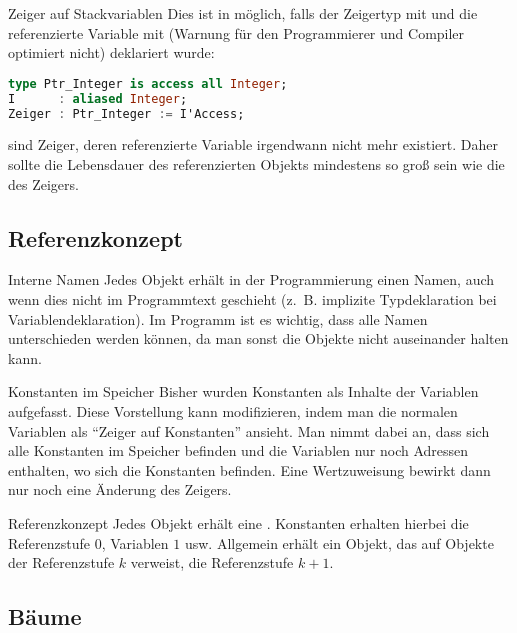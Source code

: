 \begin{Def}{Zeiger auf Stackvariablen}
    Dies ist in \Ada{} möglich, falls der Zeigertyp mit  und die
    referenzierte Variable mit  (Warnung für den Programmierer
    und Compiler optimiert nicht)
    deklariert wurde:

\begin{lstlisting}[language=ada]
type Ptr_Integer is access all Integer;
I      : aliased Integer;
Zeiger : Ptr_Integer := I'Access;
\end{lstlisting}

     sind Zeiger, deren referenzierte Variable
    irgendwann nicht mehr existiert. Daher sollte die Lebensdauer des
    referenzierten Objekts mindestens so groß sein wie die des Zeigers.
\end{Def}

\subsection{%
    Referenzkonzept%
}

\begin{Def}{Interne Namen}
    Jedes Objekt erhält in der Programmierung einen Namen, auch wenn dies nicht
    im Programmtext geschieht (z.~B. implizite Typdeklaration bei
    Variablendeklaration).
    Im Programm ist es wichtig, dass alle Namen unterschieden werden können,
    da man sonst die Objekte nicht auseinander halten kann.
\end{Def}

\begin{Def}{Konstanten im Speicher}
    Bisher wurden Konstanten als Inhalte der Variablen aufgefasst.
    Diese Vorstellung kann modifizieren, indem man die normalen Variablen als
    "`Zeiger auf Konstanten"' ansieht.
    Man nimmt dabei an, dass sich alle Konstanten im Speicher befinden und die
    Variablen nur noch Adressen enthalten, wo sich die Konstanten befinden.
    Eine Wertzuweisung bewirkt dann nur noch eine Änderung des Zeigers.
\end{Def}

\begin{Def}{Referenzkonzept}
    Jedes Objekt erhält eine .
    Konstanten erhalten hierbei die Referenzstufe $0$, Variablen $1$ usw.
    Allgemein erhält ein Objekt, das auf Objekte der Referenzstufe $k$
    verweist, die Referenzstufe $k + 1$.
\end{Def}

\subsection{%
    Bäume%
}

